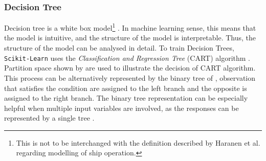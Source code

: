 \subsubsection{Decision Tree}\label{dt_theo}

Decision tree is a white box model\footnote{This is not to be interchanged with the definition described by Haranen et al. \cite{MichaelHaranen.2016} regarding modelling of ship operation.} \cite{Geron.2019}. In machine learning sense, this means that the model is intuitive, and the structure of the model is interpretable. Thus, the structure of the model can be analysed in detail. To train Decision Trees, {\tt Scikit-Learn} \cite{FabianPedregosa.2011} uses the \emph{Classification and Regression Tree} (CART) algorithm \cite{Breiman.2017}. Partition space shown by  are used to illustrate the decision of CART algorithm. This process can be alternatively represented by the binary tree of , observation that satisfies the condition are assigned to the left branch and the opposite is assigned to the right branch. The binary tree representation can be especially helpful when multiple input variables are involved, as the responses can be represented by a single tree \cite{Hastie.2009}.\\

